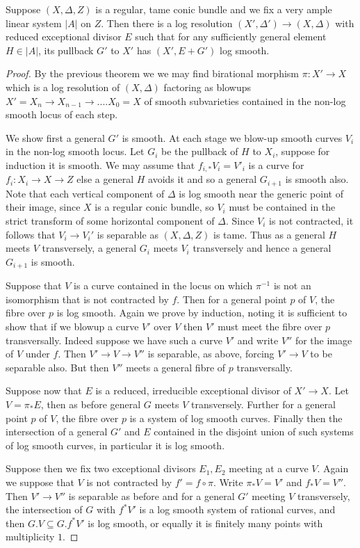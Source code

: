 \begin{corollary}
	Suppose $(X,\Delta,Z)$ is a regular, tame conic bundle and we fix a very ample linear system $|A|$ on $Z$.  Then there is a log resolution $(X',\Delta') \to (X,\Delta)$ with reduced exceptional divisor $E$ such that for any sufficiently general element $H\in |A|$, its pullback $G'$ to $X'$ has $(X',E+G')$ log smooth.
\end{corollary}
\begin{proof}
	
	By the previous theorem we we may find birational morphism $\pi\colon X' \to X$ which is a log resolution of $(X,\Delta)$ factoring as blowups $X'=X_{n} \to X_{n-1} \to .... X_{0}=X$ of smooth subvarieties contained in the non-log smooth locus of each step.
	
	We show first a general $G'$ is smooth. At each stage we blow-up smooth curves $V_{i}$ in the non-log smooth locus. Let $G_{i}$ be the pullback of $H$ to $X_{i}$, suppose for induction it is smooth. We may assume that $f_{i,*}V_{i}=V'_{i}$ is a curve for $f_{i}\colon X_{i} \to X \to Z$ else a general $H$ avoids it and so a general $G_{i+1}$ is smooth also. Note that each vertical component of $\Delta$ is log smooth near the generic point of their image, since $X$ is a regular conic bundle, so $V_{i}$ must be contained in the strict transform of some horizontal component of $\Delta$. Since $V_{i}$ is not contracted, it follows that $V_{i} \to V_{i}'$ is separable as $(X,\Delta,Z)$ is tame. Thus as a general $H$ meets $V$ transversely, a general $G_{i}$ meets $V_{i}$ transversely and hence a general $G_{i+1}$ is smooth.
	
	Suppose that $V$ is a curve contained in the locus on which $\pi^{-1}$ is not an isomorphism that is not contracted by $f$. Then for a general point $p$ of $V$, the fibre over $p$ is log smooth. Again we prove by induction, noting it is sufficient to show that if we blowup a curve $V'$ over $V$ then $V'$ must meet the fibre over $p$ transversally. Indeed suppose we have such a curve $V'$ and write $V''$ for the image of $V$ under $f$. Then $V' \to V \to V''$ is separable, as above, forcing $V' \to V$ to be separable also. But then $V''$ meets a general fibre of $p$ transversally.
	
	Suppose now that $E$ is a reduced, irreducible exceptional divisor of $X'\to X$. Let $V=\pi_{*}E$, then as before general $G$ meets $V$ transversely. Further for a general point $p$ of $V$, the fibre over $p$ is a system of log smooth curves. Finally then the intersection of a general $G'$ and $E$ contained in the disjoint union of such systems of log smooth curves, in particular it is log smooth. 
	
	Suppose then we fix two exceptional divisors $E_{1},E_{2}$ meeting at a curve $V$. Again we suppose that $V$ is not contracted by $f'=f \circ \pi$. Write $\pi_{*}V=V'$ and $f_{*}V=V''$. Then $V' \to V''$ is separable as before and for a general $G'$ meeting $V$ transversely, the intersection of $G$ with $f^{*}V'$ is a log smooth system of rational curves, and then $G.V \subseteq G.f^{*}V'$ is log smooth, or equally it is finitely many points with multiplicity $1$. 
\end{proof}

